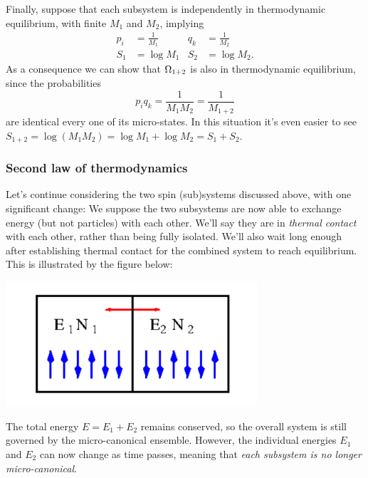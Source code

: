 Finally, suppose that each subsystem is independently in thermodynamic equilibrium, with finite $M_1$ and $M_2$, implying
\begin{align*}
  p_i & = \frac{1}{M_1} & q_k & = \frac{1}{M_2} \\
  S_1 & = \log M_1      & S_2 & = \log M_2.
\end{align*}
As a consequence we can show that $\Omega_{1+2}$ is also in thermodynamic equilibrium, since the probabilities
\begin{equation*}
  p_i q_k = \frac{1}{M_1 M_2} = \frac{1}{M_{1+2}}
\end{equation*}
are identical every one of its micro-states.
In this situation it's even easier to see $S_{1+2} = \log\left(M_1 M_2\right) = \log M_1 + \log M_2 = S_1 + S_2$.



\subsubsection{\label{sec:second_law}Second law of thermodynamics}
Let's continue considering the two spin (sub)systems discussed above, with one significant change: We suppose the two subsystems are now able to exchange energy (but not particles) with each other.
We'll say they are in \textit{thermal contact} with each other, rather than being fully isolated.
We'll also wait long enough after establishing thermal contact for the combined system to reach equilibrium.
This is illustrated by the figure below:
\begin{center}
  \includegraphics[width=0.7\textwidth]{figs/unit02_entropy-exchange.pdf}
\end{center}
The total energy $E = E_1 + E_2$ remains conserved, so the overall system \Om is still governed by the micro-canonical ensemble.
However, the individual energies $E_1$ and $E_2$ can now change as time passes, meaning that \textit{each subsystem is no longer micro-canonical}.

